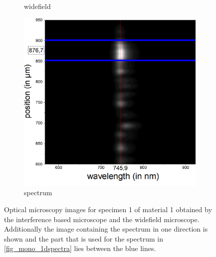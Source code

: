 \begin{figure}[H]
\begin{subfigure}{0.24\textwidth}
        \caption{widefield}
	      \label{fig_mono_spec1_wide}
    \end{subfigure}
    \begin{subfigure}{0.75\textwidth}
        \centering
        \includegraphics[width=\textwidth]{img/output_t1/bild_m1-3}
        \caption{spectrum}
	      \label{fig_mono_spec1_spec}
    \end{subfigure}
    \caption{Optical microscopy images for specimen 1 of material 1 obtained by the interference based microscope and the widefield microscope. Additionally the image containing the spectrum in one direction is shown and the part that is used for the spectrum in \cref{fig_mono_1dspectra} lies between the blue lines.}
	\label{fig_mono_spec1} %
\end{figure}

